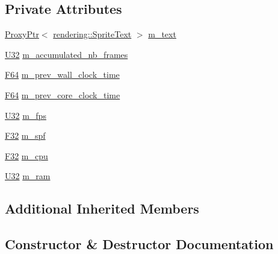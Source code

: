 \subsection*{Private Attributes}
\begin{DoxyCompactItemize}
\item 
\mbox{\hyperlink{classmage_1_1_proxy_ptr}{Proxy\+Ptr}}$<$ \mbox{\hyperlink{classmage_1_1rendering_1_1_sprite_text}{rendering\+::\+Sprite\+Text}} $>$ \mbox{\hyperlink{classmage_1_1script_1_1_stats_script_a1fe11e7a3622fa5e3585fb6786e2d2e7}{m\+\_\+text}}
\item 
\mbox{\hyperlink{namespacemage_a41c104c036fba3756a74e19f793eeaa1}{U32}} \mbox{\hyperlink{classmage_1_1script_1_1_stats_script_a7ef910aceb585af53110697ea5b3f810}{m\+\_\+accumulated\+\_\+nb\+\_\+frames}}
\item 
\mbox{\hyperlink{namespacemage_ad26233bbec640deda836e572c1a23708}{F64}} \mbox{\hyperlink{classmage_1_1script_1_1_stats_script_a1f929fd926b90c7615e5ffc31bae8b93}{m\+\_\+prev\+\_\+wall\+\_\+clock\+\_\+time}}
\item 
\mbox{\hyperlink{namespacemage_ad26233bbec640deda836e572c1a23708}{F64}} \mbox{\hyperlink{classmage_1_1script_1_1_stats_script_a3bd65146319e43de291a11a123b8101e}{m\+\_\+prev\+\_\+core\+\_\+clock\+\_\+time}}
\item 
\mbox{\hyperlink{namespacemage_a41c104c036fba3756a74e19f793eeaa1}{U32}} \mbox{\hyperlink{classmage_1_1script_1_1_stats_script_adc14b9c342874824422d229c1f8573cc}{m\+\_\+fps}}
\item 
\mbox{\hyperlink{namespacemage_aa97e833b45f06d60a0a9c4fc22ae02c0}{F32}} \mbox{\hyperlink{classmage_1_1script_1_1_stats_script_a999da0fb2033212522a1c45a992dcd37}{m\+\_\+spf}}
\item 
\mbox{\hyperlink{namespacemage_aa97e833b45f06d60a0a9c4fc22ae02c0}{F32}} \mbox{\hyperlink{classmage_1_1script_1_1_stats_script_ad7af4d0fec97fd30637d6c1d393c8623}{m\+\_\+cpu}}
\item 
\mbox{\hyperlink{namespacemage_a41c104c036fba3756a74e19f793eeaa1}{U32}} \mbox{\hyperlink{classmage_1_1script_1_1_stats_script_a2a064095ffab6d72370808f383a16580}{m\+\_\+ram}}
\end{DoxyCompactItemize}
\subsection*{Additional Inherited Members}


\subsection{Constructor \& Destructor Documentation}
\mbox{\label{classmage_1_1script_1_1_stats_script_a6863940cb48633fbd5fc56547dc72a76}} 
